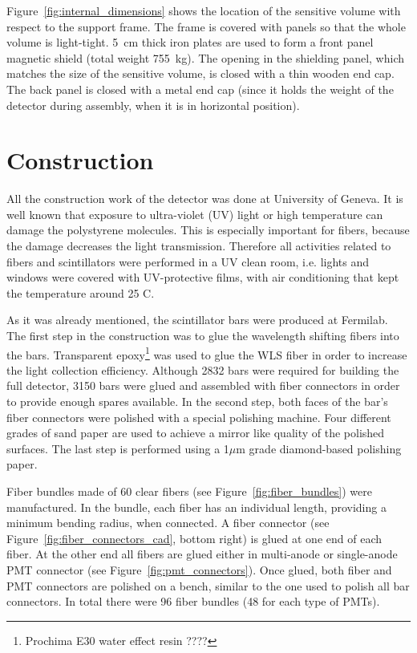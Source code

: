\documentclass[a4paper,11pt]{article}
\begin{document}
Figure~\ref{fig:internal_dimensions} shows the location of the sensitive volume with respect to the support frame. The frame is covered with panels so that
the whole volume is light-tight. 5~cm thick iron plates are used to form a front panel magnetic shield (total weight 755~kg). The opening in the shielding
panel, which matches the size of the sensitive volume, is closed with a thin wooden end cap. The back panel is closed with a metal end cap (since it holds
the weight of the detector during assembly, when it is in horizontal position).

\section{Construction}\label{sec:construction}

All the construction work of the detector was done at University of Geneva. It is well known that exposure to ultra-violet (UV) light or high temperature
can damage the polystyrene molecules. This is especially important for fibers, because the damage decreases the light transmission. Therefore all activities
related to fibers and scintillators were performed in a UV clean room, i.e. lights and windows were covered with UV-protective films, with air conditioning
that kept the temperature around 25 \degree C. 

As it was already mentioned, the scintillator bars were produced at Fermilab. The first step in the construction was to glue the wavelength shifting fibers
into the bars. Transparent epoxy\footnote{Prochima E30 water effect resin ????} was used to glue the WLS fiber in order to increase the light collection
efficiency. Although 2832 bars were required for building the full detector, 3150 bars were glued and assembled with fiber connectors in
order to provide enough spares available. In the second step, both faces of the bar's fiber connectors were polished with a special polishing machine. Four
different grades of sand paper are used to achieve a mirror like quality of the polished surfaces. The last step is performed using a 1$\mu$m grade
diamond-based polishing paper.

Fiber bundles made of 60 clear fibers (see Figure~\ref{fig:fiber_bundles}) were manufactured. In the bundle, each fiber has an individual length, providing
a minimum bending radius, when connected. A fiber connector (see Figure~\ref{fig:fiber_connectors_cad}, bottom right) is glued at one end of each fiber. At
the other end all fibers are glued either in multi-anode or single-anode PMT connector (see Figure~\ref{fig:pmt_connectors}). Once glued, both fiber and PMT
connectors are polished on a bench, similar to the one used to polish all bar connectors. In total there were 96 fiber bundles (48 for each type of PMTs).
\end{document}
